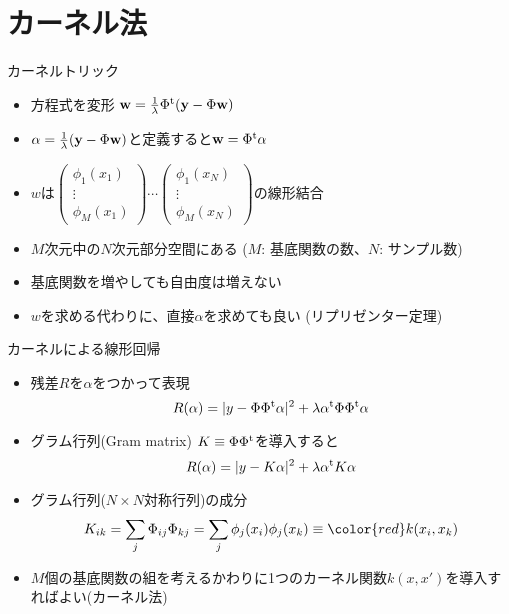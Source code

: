 \section{カーネル法}

\begin{frame}[t,fragile]{カーネルトリック}
  \begin{itemize}
  \item 方程式を変形 ${\bf w} = \frac{1}{\lambda} \Phi^{\rm t} ({\bf y} -\Phi {\bf w})$
  \item $\alpha = \frac{1}{\lambda}({\bf y} -\Phi {\bf w})$と定義すると${\bf w} =\Phi^{\rm t} \alpha$
    \item $w$は$\begin{pmatrix} \phi_1(x_1) \\ \vdots \\ \phi_M(x_1) \end{pmatrix} \cdots 
      \begin{pmatrix} \phi_1(x_N) \\ \vdots \\ \phi_M(x_N) \end{pmatrix}$の線形結合
    \item $M$次元中の$N$次元部分空間にある ($M$: 基底関数の数、$N$: サンプル数)
    \item 基底関数を増やしても自由度は増えない
    \item $w$を求める代わりに、直接$\alpha$を求めても良い (リプリゼンター定理)
  \end{itemize}
\end{frame}

\begin{frame}[t,fragile]{カーネルによる線形回帰}
  \begin{itemize}
  \item 残差$R$を$\alpha$をつかって表現
    \[
    R(\alpha) = | y - \Phi \Phi^{\rm t} \alpha |^2 + \lambda \alpha^{\rm t} \Phi \Phi^{\rm t} \alpha
    \]
  \item グラム行列(Gram matrix) $K \equiv \Phi \Phi^{\rm t}$を導入すると
    \[
    R(\alpha) = | y - K \alpha |^2 + \lambda \alpha^{\rm t} K \alpha
    \]
  \item グラム行列($N \times N$対称行列)の成分
    \[
    K_{ik} = \sum_j \Phi_{ij} \Phi_{kj} = \sum_j \phi_j(x_i) \phi_j(x_k) \equiv {\color{red} k(x_i,x_k)}
    \]
  \item $M$個の基底関数の組を考えるかわりに1つのカーネル関数$k(x,x')$を導入すればよい(カーネル法)
  \end{itemize}
\end{frame}

